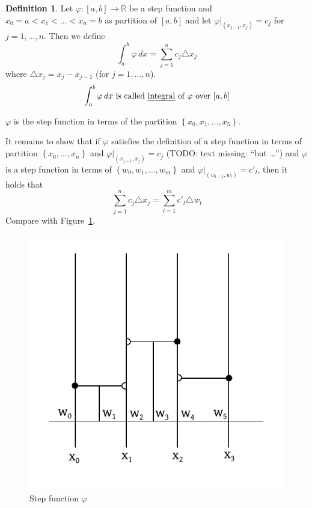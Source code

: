 \documentclass[a4paper,landscape,twocolumn]{article}
\theoremstyle{definition}
\newtheorem{defi}{Definition}
\newcommand\set[1]{\left\{#1\right\}}
\begin{document}
\begin{defi}
  Let $\varphi:[a,b] \to \mathbb R$ be a step function and
  $x_0 = a < x_1 < \ldots < x_n = b$ as partition of
  $[a,b]$ and let $\varphi|_{(x_{j-1}, x_j)} = c_j$
  for $j = 1,\ldots,n$.
  Then we define
  \[ \int_a^b \varphi \,dx = \sum_{j=1}^n c_j \triangle x_j \]
  where
  $\triangle x_j = x_j - x_{j-1}$ (for $j=1,\ldots,n$).
  \[ \int_a^b \varphi \, dx \text{ is called \emph{integral} of $\varphi$ over $[a,b]$} \]
\end{defi}

$\varphi$ is the step function in terms of the partition $\set{x_0,x_1,\ldots, x_5}$.

It remains to show that if $\varphi$ satisfies the definition of a step function in terms of
partition $\set{x_0,\ldots,x_n}$ and $\varphi|_{(x_{j-1}, x_j)} = c_j$
(TODO: text missing: \enquote{but \ldots})
and $\varphi$ is a step function in terms of $\set{w_0,w_1,\ldots,w_m}$
and $\varphi|_{(w_{l-1},w_l)} = c'_l$, then it holds that
\[ \sum_{j=1}^n c_j \triangle x_j = \sum_{l=1}^m c'_l \triangle w_l \]
Compare with Figure~\ref{img:step-function}.

\begin{figure}[!h]
  \begin{center}
    \includegraphics{img/step-function.pdf}
    \caption{Step function $\varphi$}
    \label{img:step-function}
  \end{center}
\end{figure}
\end{document}
